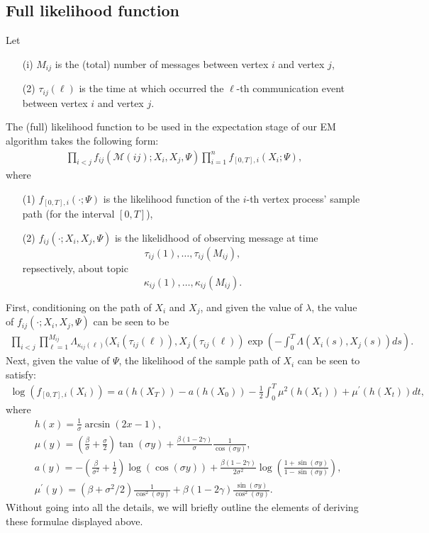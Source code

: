 \documentclass[12pt]{article}%
\begin{document}
\subsection{Full likelihood function}
Let
\begin{enumerate}
\item[(i)] $M_{ij}$ is the (total) number of messages between vertex $i$ and vertex $j$,
\item[(2)] $\tau_{ij}(\ell)$ is the time at which occurred the $\ell$-th communication event 
between vertex $i$ and vertex $j$.
\end{enumerate}
The (full) likelihood function to be used in the expectation stage of our EM algorithm takes the following form:
\begin{eqnarray}
\prod_{i<j} f_{ij}(\mathcal M(ij);X_i,X_j,\Psi) \prod_{i=1}^n f_{[0,T],i}(X_i;\Psi),
\end{eqnarray}
where 
\begin{enumerate}
\item[(1)] $f_{[0,T],i}(\cdot;\Psi)$ is the likelihood function of the $i$-th vertex 
process' sample path (for the interval $[0,T]$),
\item[(2)] $f_{ij}(\cdot;X_i,X_j,\Psi)$ is the likelidhood of 
observing message at time 
$$
\tau_{ij}(1),\ldots, \tau_{ij}(M_{ij}),
$$
repsectively, about topic 
$$
\kappa_{ij}(1),\ldots, \kappa_{ij}(M_{ij}).
$$
\end{enumerate}

First, conditioning on the path of $X_i$ and $X_j$, and given the value of $\lambda$,   
the value of $f_{ij}(\cdot;X_i,X_j,\Psi)$ can be seen to be
\begin{eqnarray}\label{formula2010.12.19.12.31.pm}
\prod_{i<j} \prod_{\ell=1}^{M_{ij}} \Lambda_{\kappa_{ij}(\ell)}(X_i(\tau_{ij}(\ell)),X_j(\tau_{ij}(\ell)) \exp\left(-\int_0^T \Lambda(X_i(s),X_j(s)) ds\right).
\end{eqnarray}
Next, given the value of $\Psi$, the likelihood of the sample path of $X_i$ can be 
seen to satisfy:
\begin{eqnarray}\label{formula2010.12.19.01.07.pm}
\log(f_{[0,T],i}(X_i)) 
=
a(h(X_T)) - a(h(X_0)) 
-\frac{1}{2} \int_0^T \mu^2(h(X_t)) +\mu^\prime(h(X_t)) dt,
\end{eqnarray}
where 
\begin{eqnarray}
&h(x) = \frac{1}{\sigma} \arcsin(2x - 1),\\
&\mu(y) = \left(\frac{\beta}{\sigma} + \frac{\sigma}{2}\right) \tan(\sigma y)
+\frac{\beta(1-2\gamma)}{\sigma} \frac{1}{\cos(\sigma y)},\\
&a(y) = - \left(\frac{\beta}{\sigma^2}+\frac{1}{2}\right) \log(\cos(\sigma y))
+ \frac{\beta (1-2\gamma)}{2\sigma^2} \log\left(\frac{1+\sin(\sigma y)}{1-\sin(\sigma y)}\right),\\
&\mu^\prime(y) = 
(\beta+ \sigma^2/2) \frac{1}{\cos^2(\sigma y)} + \beta (1-2\gamma) \frac{\sin(\sigma y)}{\cos^2(\sigma y)}. 
\end{eqnarray}
Without going into all the details, we will briefly outline the elements of 
deriving these formulae displayed above.  
\end{document}
